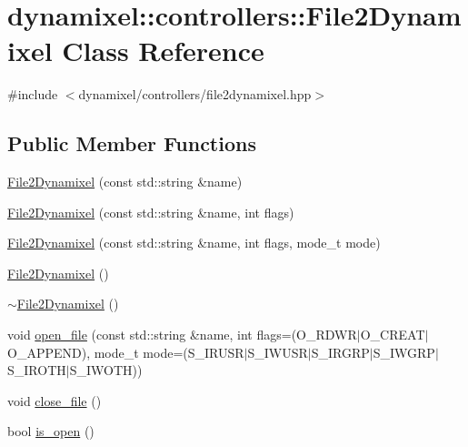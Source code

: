 \hypertarget{classdynamixel_1_1controllers_1_1_file2_dynamixel}{}\section{dynamixel\+:\+:controllers\+:\+:File2\+Dynamixel Class Reference}
\label{classdynamixel_1_1controllers_1_1_file2_dynamixel}


{\ttfamily \#include $<$dynamixel/controllers/file2dynamixel.\+hpp$>$}

\subsection*{Public Member Functions}
\begin{DoxyCompactItemize}
\item 
\hyperlink{classdynamixel_1_1controllers_1_1_file2_dynamixel_a9ff507ed75ea792e2fefa4bbb3b71145}{File2\+Dynamixel} (const std\+::string \&name)
\item 
\hyperlink{classdynamixel_1_1controllers_1_1_file2_dynamixel_adc49cde6130371a242f99d09b924fa31}{File2\+Dynamixel} (const std\+::string \&name, int flags)
\item 
\hyperlink{classdynamixel_1_1controllers_1_1_file2_dynamixel_a405baa0d39511e927743c426c6993d76}{File2\+Dynamixel} (const std\+::string \&name, int flags, mode\+\_\+t mode)
\item 
\hyperlink{classdynamixel_1_1controllers_1_1_file2_dynamixel_a10e6303a5e4d76415072f83c8048e865}{File2\+Dynamixel} ()
\item 
\hyperlink{classdynamixel_1_1controllers_1_1_file2_dynamixel_a0b96fae42238a5c4c727df0eca5f363f}{$\sim$\+File2\+Dynamixel} ()
\item 
void \hyperlink{classdynamixel_1_1controllers_1_1_file2_dynamixel_a1e68d04cdaf13238b6c8cfed0a5ddcf4}{open\+\_\+file} (const std\+::string \&name, int flags=(O\+\_\+\+R\+D\+WR$\vert$O\+\_\+\+C\+R\+E\+AT$\vert$O\+\_\+\+A\+P\+P\+E\+ND), mode\+\_\+t mode=(S\+\_\+\+I\+R\+U\+SR$\vert$S\+\_\+\+I\+W\+U\+SR$\vert$S\+\_\+\+I\+R\+G\+RP$\vert$S\+\_\+\+I\+W\+G\+RP$\vert$S\+\_\+\+I\+R\+O\+TH$\vert$S\+\_\+\+I\+W\+O\+TH))
\item 
void \hyperlink{classdynamixel_1_1controllers_1_1_file2_dynamixel_a52e59b1b366fea5e23672bdd6c424769}{close\+\_\+file} ()
\item 
bool \hyperlink{classdynamixel_1_1controllers_1_1_file2_dynamixel_a6786062337b8089f25f5d7899d18a000}{is\+\_\+open} ()

\end{DoxyCompactItemize}
